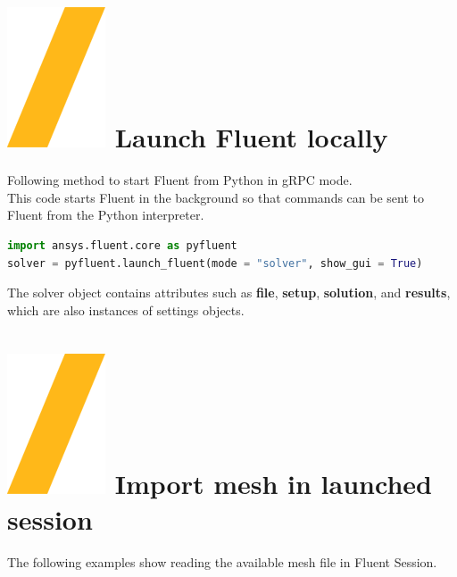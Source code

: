 \documentclass[9pt,landscape]{article}
\begin{document}
\begin{multicols}{3}
\setlength{\premulticols}{1pt}
\setlength{\postmulticols}{1pt}
\setlength{\multicolsep}{1pt}
\setlength{\columnsep}{2pt}

\vfill
\section{\includegraphics[height=\fontcharht\font`\S]{slash.png} Launch Fluent locally}
Following method to start Fluent from Python in gRPC mode.\\
This code starts Fluent in the background so that commands can be sent to Fluent from the Python interpreter.

\begin{lstlisting}[language=Python]
import ansys.fluent.core as pyfluent
solver = pyfluent.launch_fluent(mode = "solver", show_gui = True)
\end{lstlisting}

The solver object contains attributes such as \textbf{file}, \textbf{setup}, \textbf{solution}, and \textbf{results}, 
which are also instances of settings objects. 

\section{\includegraphics[height=\fontcharht\font`\S]{slash.png} Import mesh in launched session}

The following examples show reading the available mesh file in Fluent Session.


\end{multicols}
\end{document}

